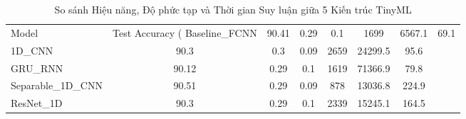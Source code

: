 \begin{table}[htbp]
\centering
\caption{So sánh Hiệu năng, Độ phức tạp và Thời gian Suy luận giữa 5 Kiến trúc TinyML}
\label{tab:bench_models}
\begin{tabular}{lcccccc}
\toprule
Model & Test Accuracy (%
\midrule
Baseline_FCNN & 90.41 & 0.29 & 0.1 & 1699 & 6567.1 & 69.1 \\
1D_CNN & 90.3 & 0.3 & 0.09 & 2659 & 24299.5 & 95.6 \\
GRU_RNN & 90.12 & 0.29 & 0.1 & 1619 & 71366.9 & 79.8 \\
Separable_1D_CNN & 90.51 & 0.29 & 0.09 & 878 & 13036.8 & 224.9 \\
ResNet_1D & 90.3 & 0.29 & 0.1 & 2339 & 15245.1 & 164.5 \\
\bottomrule
\end{tabular}
\end{table}
